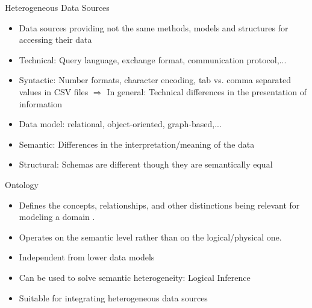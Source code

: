 \begin{frame}{Heterogeneous Data Sources}
    \begin{itemize}
    \item Data sources providing not the same methods, models  and structures for accessing their data
    \item Technical: Query language, exchange format, communication protocol,...
    \item Syntactic: Number formats, character encoding, tab vs. comma separated values in CSV files  $\Rightarrow$ In general: Technical differences in the presentation of information
    \item Data model: relational, object-oriented, graph-based,...
    \item Semantic: Differences in the interpretation/meaning of the data
    \item Structural: Schemas are different though they are semantically equal 
    \end{itemize}
\end{frame}

\begin{frame}{Ontology}
    \begin{itemize}
    \item Defines the concepts, relationships, and other distinctions being relevant for modeling a domain \cite{9780387355443}.
    \item Operates on the semantic level rather than on the logical/physical one.
    \item Independent from lower data models
    \item Can be used to solve semantic heterogeneity: Logical Inference
    \item Suitable for integrating heterogeneous data sources 
    \end{itemize}
\end{frame}



